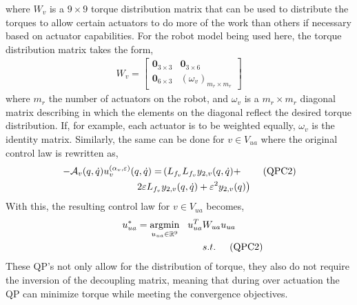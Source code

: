 where $W_{v}$ is a $9 \times 9$ torque distribution matrix that can be used to distribute the torques to allow certain actuators to do more of the work than others if necessary based on actuator capabilities. For the robot model being used here, the torque distribution matrix takes the form,
\begin{align}
\label{eq:torquedist}
 W_{v} = 
 \begin{bmatrix}
  \mathbf{0}_{3 \times 3} & \mathbf{0}_{3 \times 6} \\
  \mathbf{0}_{6 \times 3} & (\omega_{v})_{m_{r} \times m_{r}}
 \end{bmatrix}
\end{align}
where $m_{r}$ the number of actuators on the robot, and $\omega_{v}$ is a $m_{r} \times m_{r}$ diagonal matrix describing in which the elements on the diagonal reflect the desired torque distribution. If, for example, each actuator is to be weighted equally, $\omega_{v}$ is the identity matrix. Similarly, the same can be done for $v \in V_{ua}$ where the original control law is rewritten as,
\begin{align}
-\indexbyvertex{\decouplingmatrix}(\q,\dq) \indexbyvertex{\control^{(\param_{v},\controlgain)}}(\q,\dq) = & \left( L_{f_v}L_{f_v}\ytwo(\q,\dq) + \right. \tag{QPC2} \\
 & \hspace{-10mm} \left. 2 \controlgain L_{f_v}\ytwo(\q,\dq) + \controlgain^2 \ytwo(\q)\right) \nonumber
\end{align}
With this, the resulting control law for $v \in V_{ua}$ becomes,
\begin{align}
 u^{*}_{ua} = \underset{u_{ua} \in \mathbb{R}^{9}}{\mathrm{argmin}} \hspace{3mm} u^{T}_{ua}W_{ua} u_{ua} \hspace{0mm} \\
  s.t. \hspace{5mm} \mathrm{(QPC2)} \hspace{-10mm} \nonumber
\end{align}
These QP's not only allow for the distribution of torque, they also do not require the inversion of the decoupling matrix, meaning that during over actuation the QP can minimize torque while meeting the convergence objectives.

